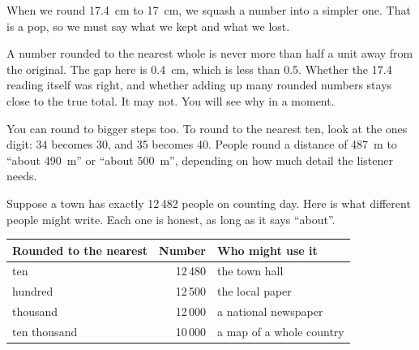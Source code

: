 When we round 17.4~cm to 17~cm, we squash a number into a simpler one. That is a pop, so we must say what we kept and what we lost.

\begin{center}
\end{center}

{A number rounded to the nearest whole is never more than half a unit away from the original. The gap here is 0.4~cm, which is less than 0.5.}
{Whether the 17.4 reading itself was right, and whether adding up many rounded numbers stays close to the true total. It may not. You will see why in a moment.}

You can round to bigger steps too. To round to the nearest ten, look at the ones digit: 34 becomes 30, and 35 becomes 40. People round a distance of 487~m to ``about 490~m'' or ``about 500~m'', depending on how much detail the listener needs.

Suppose a town has exactly 12\,482 people on counting day. Here is what different people might write. Each one is honest, as long as it says ``about''.

\begin{center}
\sffamily\small\renewcommand{\arraystretch}{1.5}
\begin{tabular}{@{}lr@{\qquad}l@{}}
\toprule
\textbf{Rounded to the nearest} & \textbf{Number} & \textbf{Who might use it}\\
\midrule
ten & 12\,480 & the town hall\\
hundred & 12\,500 & the local paper\\
thousand & 12\,000 & a national newspaper\\
ten thousand & 10\,000 & a map of a whole country\\
\bottomrule
\end{tabular}
\end{center}

